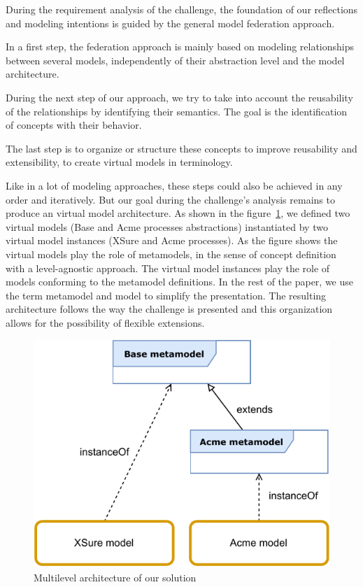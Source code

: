
During the requirement analysis of the challenge, the foundation of our reflections and modeling intentions is guided by the general model federation approach.

In a first step, the federation approach is mainly based on modeling relationships between several models, independently of their abstraction level and the model architecture.

During the next step of our approach, we try to take into account the reusability of the relationships by identifying their semantics. The goal is the identification of concepts with their behavior.

The last step is to organize or structure these concepts to improve reusability and extensibility, to create virtual models in \FML terminology.

Like in a lot of modeling approaches, these  steps could also be achieved in any order and iteratively. But our goal during the challenge's analysis remains to produce an \FML virtual model architecture.
As shown in the figure~\ref{fig:MultilevelArchitecture}, we defined two virtual models (Base and Acme processes abstractions) instantiated by two virtual model instances (XSure and Acme processes). As the figure shows the virtual models play the role of metamodels, in the sense of concept definition with a level-agnostic approach. The virtual model instances play the role of models conforming to the metamodel definitions. In the rest of the paper, we use the term metamodel and model to simplify the presentation.
The resulting architecture follows the way the challenge is presented and this
organization allows for the possibility of flexible extensions.


\begin{figure}[t]
    \centering
    \includegraphics[width=0.9 \columnwidth]{Figures/MultilevelArchitecture.pdf}
    \caption{Multilevel architecture of our solution}
    \label{fig:MultilevelArchitecture}
\end{figure}


